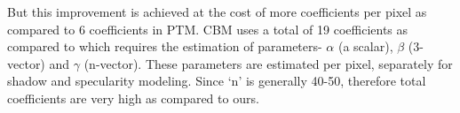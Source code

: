 But this improvement is achieved at the cost of more coefficients per pixel as compared to 6 coefficients in PTM.
CBM uses a total of 19 coefficients as compared to \cite{chap2-9} which requires the estimation of parameters- $\alpha$ (a scalar), 
$\beta$ (3-vector) and $\gamma$ (n-vector). These parameters are estimated per pixel, separately for shadow and specularity
modeling. Since `n' is generally 40-50, therefore total coefficients are very high as compared to ours.


